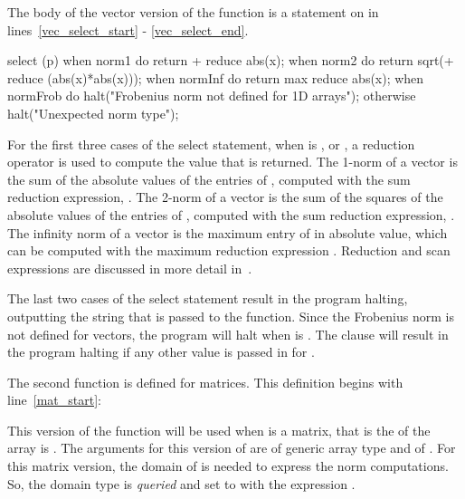 The body of the vector version of the  function is a  statement on
 in lines~\ref{vec_select_start} - \ref{vec_select_end}.  
\begin{chapel}
select (p) {                                   
      when norm1 do return + reduce abs(x);   
      when norm2 do return sqrt(+ reduce (abs(x)*abs(x)));  
      when normInf do return max reduce abs(x);  
      when normFrob do halt("Frobenius norm not defined for 1D arrays");
      otherwise halt("Unexpected norm type"); 
    } 
\end{chapel}
For the first three cases of the select statement,
when  is ,  or ,
a reduction operator is used to compute the value that is returned. 
The 1-norm of a vector is the sum of the absolute values of the entries of ,
computed with the sum reduction expression, .
The 2-norm of a vector is the sum of the squares of the absolute values of
the entries of , computed with the sum reduction expression,
.
The infinity norm of a vector is the maximum entry of  in absolute value,
which can be computed with the maximum reduction expression .
Reduction and scan expressions are discussed in more detail 
in~.  

The last two cases of the select statement result
in the program halting, outputting the string that is passed to the 
function.  Since the Frobenius norm is not defined for vectors, the program
will halt when  is .  The  clause will
result in the program halting if any other value is passed in for .

The second  function is defined for matrices.  This definition begins
with line~\ref{mat_start}:
\begin{chapel}
  def norm(x: [?D], p: normType) where x.rank == 2 {
\end{chapel}
This version of the function will be used when  is a matrix,
that is the  of the array  is .  The arguments
for this version of  are  of generic array type and 
of .  For this matrix version, the domain of  is
needed to express the  norm computations.  So, the domain type is {\em queried} 
and set to  with the expression \chpl{[?D]}.  

